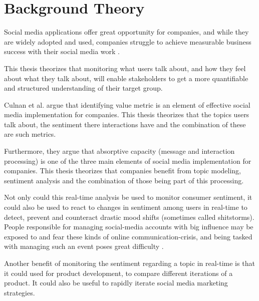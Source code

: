 
\chapter{Background Theory}

\label{ch:backgroundTheory}


Social media applications offer great opportunity for companies,
and while they are widely adopted and used,
companies struggle to achieve measurable business success with their social media work \cite{Culnan2015}.
\par
This thesis theorizes that monitoring what users talk about,
and how they feel about what they talk about,
will enable stakeholders to get a more quantifiable and structured understanding of their target group.
\par
Culnan et al. \cite{Culnan2015} %
argue that identifying value metric is an element of effective social media implementation for companies.
This thesis theorizes that the topics users talk about, the sentiment there interactions have and the combination of these are such metrics.
\par
Furthermore, they argue that absorptive capacity (message and interaction processing) is one of the three main elements of social media implementation for companies.
This thesis theorizes that companies benefit from topic modeling, sentiment analysis and the combination of those being part of this processing.
\par
Not only could this real-time analysis be used to monitor consumer sentiment,
it could also be used to react to changes in sentiment among users in real-time to detect, prevent and counteract
drastic mood shifts (sometimes called shitstorms).
People responsible for managing social-media accounts with big influence may be exposed to and fear these kinds of online communication-crisis,
and being tasked with managing such an event poses great difficulty \cite{Salzborn2015}.
\par
Another benefit of monitoring the sentiment regarding a topic in real-time is that it could used for product development,
to compare different iterations of a product.
It could also be useful to rapidly iterate social media marketing strategies.
